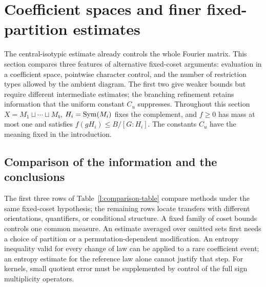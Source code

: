 \section{Coefficient spaces and finer fixed-partition estimates}
\label{l:comparisons-section}

The central-isotypic estimate already controls the whole Fourier matrix. This section compares three features of alternative fixed-coset arguments: evaluation in a coefficient space, pointwise character control, and the number of restriction types allowed by the ambient diagram. The first two give weaker bounds but require different intermediate estimates; the branching refinement retains information that the uniform constant $C_u$ suppresses. Throughout this section $X=M_1\sqcup\cdots\sqcup M_b$, $H_i=\operatorname{Sym}(M_i)$ fixes the complement, and $f\ge0$ has mass at most one and satisfies $f(gH_i)\le B/[G:H_i]$. The constants $C_u$ have the meaning fixed in the introduction.

\subsection{Comparison of the information and the conclusions}

The first three rows of Table~\ref{l:comparison-table} compare methods under the same fixed-coset hypothesis; the remaining rows locate transfers with different orientations, quantifiers, or conditional structure. A fixed family of coset bounds controls one common measure. An estimate averaged over omitted sets first needs a choice of partition or a permutation-dependent modification. An entropy inequality valid for every change of law can be applied to a rare coefficient event; an entropy estimate for the reference law alone cannot justify that step. For kernels, small quotient error must be supplemented by control of the full sign multiplicity operators.

